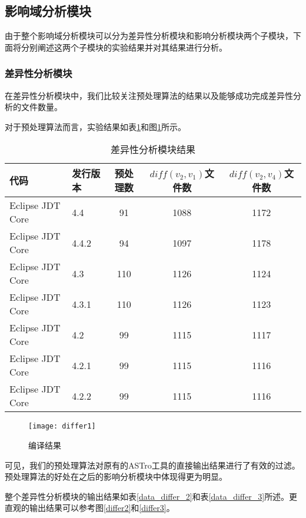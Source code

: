 \subsection{影响域分析模块}

由于整个影响域分析模块可以分为差异性分析模块和影响分析模块两个子模块，下面将分别阐述这两个子模块的实验结果并对其结果进行分析。

\subsubsection{差异性分析模块}

在差异性分析模块中，我们比较关注预处理算法的结果以及能够成功完成差异性分析的文件数量。

对于预处理算法而言，实验结果如表\ref {data_differ_1}和图\ref {differ1}所示。

\begin{table}[H]
	\caption{差异性分析模块结果}
	\label{data_differ_1}
	\centering
	\begin{tabular}{llccc}
		\toprule[1.5pt]
		{\heiti 代码} & {\heiti 发行版本} & {\heiti 预处理数} & {\heiti $diff(v_2,v_1)$文件数} & {\heiti $diff(v_2,v_4)$文件数} \\\midrule[1pt]
		Eclipse JDT Core & 4.4	& 91 & 1088 & 1172	\\		
		Eclipse JDT Core & 4.4.2 & 94 & 1097 & 1178		\\
		Eclipse JDT Core & 4.3 	& 110 & 1126 & 1124			\\
		Eclipse JDT Core & 4.3.1 & 110 & 1126 & 1123			\\
		Eclipse JDT Core & 4.2 	& 99 & 1115 & 1117		\\
		Eclipse JDT Core & 4.2.1 & 99 & 1115 & 1116			\\
		Eclipse JDT Core & 4.2.2 & 99 & 1115 & 1116		\\
		\bottomrule[1.5pt]
	\end{tabular}
\end{table}

\begin{figure}[H]
	\centering
	\texttt{[image: differ1]}
	\caption {编译结果}
	\label {differ1}	
\end{figure}

可见，我们的预处理算法对原有的ASTro工具的直接输出结果进行了有效的过滤。预处理算法的好处在之后的影响分析模块中体现得更为明显。

整个差异性分析模块的输出结果如表\ref {data_differ_2}和表\ref {data_differ_3}所述。更直观的输出结果可以参考图\ref {differ2}和\ref {differ3}。

